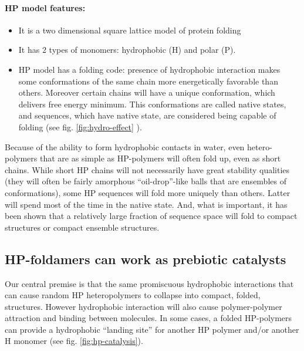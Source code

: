 \documentclass[journal=jacsat,manuscript=article,layout=twocolumn]{achemso}
\begin{document}
\paragraph{HP model features:} 
\begin{itemize}
 \item It is a two dimensional square lattice model of protein folding
 \item It has 2 types of monomers: hydrophobic (H) and polar (P). 
 \item HP model has a folding code: presence of hydrophobic interaction makes some conformations 
of the same chain more energetically favorable than others. Moreover certain chains will have a 
unique conformation, which delivers free energy minimum. This conformations are called native 
states, and sequences, which have native state, are considered being capable of folding (see fig. 
\ref{fig:hydro-effect} ).
\end{itemize}

Because of the ability to form hydrophobic contacts in water, even hetero-polymers that 
are as simple as HP-polymers will often fold up, even as short chains. 
While short HP chains will not necessarily have great stability qualities (they will often be 
fairly amorphous ``oil-drop''-like balls that are ensembles of conformations), some HP 
sequences will fold more uniquely than others. Latter will spend most of the time in the native 
state. And, what is important, it has been shown that a 
relatively large fraction of sequence space will fold to compact structures or compact ensemble 
structures\cite{lau1989lattice}.

\subsection{HP-foldamers can work as prebiotic catalysts}
Our central premise is that the same promiscuous hydrophobic interactions that can cause random 
HP heteropolymers to collapse into compact, folded, structures. However hydrophobic 
interaction will also cause polymer-polymer attraction and binding between molecules.  In some 
cases, a folded HP-polymers can provide a hydrophobic ``landing site'' for another HP polymer 
and/or another H monomer (see fig. \ref{fig:hp-catalysis}).  
\end{document}
